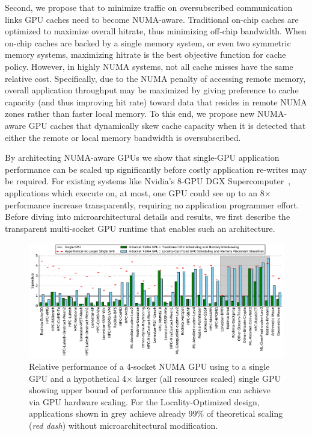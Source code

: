 Second, we propose that to minimize traffic on oversubscribed communication 
links GPU caches need to become NUMA-aware.  Traditional on-chip caches are 
optimized to maximize overall hitrate, thus minimizing off-chip bandwidth.  
When on-chip caches are backed by a single memory system, or even two 
symmetric memory systems, maximizing hitrate is the best objective function 
for cache policy.  However, in highly NUMA systems,  not all cache misses 
have the same relative cost.  Specifically, due to the NUMA penalty of 
accessing remote memory, overall application throughput may be maximized by 
giving preference to cache capacity (and thus improving hit rate) toward data 
that resides in remote NUMA zones rather than faster local memory. To this 
end, we propose new NUMA-aware GPU caches that dynamically skew cache 
capacity when it is detected that either the remote or local memory bandwidth 
is oversubscribed.

By architecting NUMA-aware GPUs we show that single-GPU application performance 
can be scaled up significantly before costly application re-writes may be 
required. For existing systems like Nvidia's 8-GPU DGX 
Supercomputer~\cite{dgx}, applications which execute on, at most, one GPU could 
see up to an 8$\times$ performance increase transparently, requiring no 
application programmer effort. Before diving into microarchitectural details and 
results, we first describe the transparent multi-socket GPU runtime that enables 
such an architecture.

\begin{figure}[tp] 
    \centering
    \includegraphics[width=1.0\linewidth]{figures/plot_different_baselines.pdf}
    \caption{Relative performance of a 4-socket NUMA GPU using to a single GPU 
and a hypothetical 4$\times$ larger (all resources scaled) single GPU showing 
upper bound of performance this application can achieve via GPU hardware 
scaling. For the Locality-Optimized design, applications shown in grey 
achieve already 99\% of theoretical scaling (\emph{red dash}) without 
microarchitectural modification.}
    \label{fig:motivation}
    \vspace{-.2in}
\end{figure}
